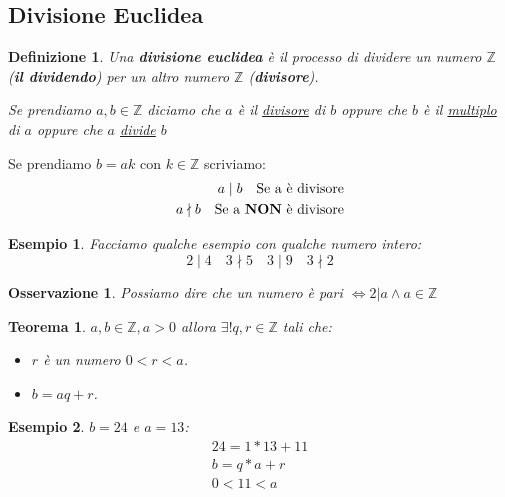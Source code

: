 \documentclass{article}
\newtheorem{exmp}{Esempio}[section]
\newtheorem{theorem}{Teorema}[section]
\newtheorem{definition}{Definizione}[section]
\newtheorem{oss}{Osservazione}[section]
\begin{document}
\subsection{Divisione Euclidea}\label{sec:divisione_euclidea}
\begin{definition}
       Una \textbf{divisione euclidea} è il processo di dividere un numero $ \mathbb{Z} $ (\textbf{il dividendo}) per un altro numero $ \mathbb{Z} $ (\textbf{divisore}). \par
       Se prendiamo $ a,b \in \mathbb{Z} $ diciamo che $ a $ è il \underline{divisore} di $ b $ oppure che $ b $ è il \underline{multiplo} di $ a $ oppure che $ a $ \underline{divide} $ b $        
\end{definition}

Se prendiamo $ b = ak $ con $ k \in \mathbb{Z} $ scriviamo:
\begin{align*}
        a \mid b \quad \mbox{Se a è divisore} \\
        a \nmid b \quad \mbox{Se a \textbf{NON} è divisore}
\end{align*}

\begin{exmp}
        Facciamo qualche esempio con qualche numero intero:
        \begin{equation*}
                2 \mid 4 \quad 3 \nmid 5 \quad 3 \mid 9 \quad 3 \nmid 2
        \end{equation*} 
\end{exmp}

\begin{oss}
       Possiamo dire che un numero è pari $ \Leftrightarrow 2 | a \wedge a \in \mathbb{Z} $  
\end{oss}

\begin{theorem}
       $ a,b \in \mathbb{Z}, a > 0 $ allora $ \exists! q,r \in \mathbb{Z}  $ tali che:
       \begin{itemize}
               \item $ r $ è un numero $ 0 < r < a $.
               \item $ b = aq + r $.  
       \end{itemize}
\end{theorem}

\begin{exmp}
        $ b = 24 $ e $ a = 13 $:
        \begin{align*}
                24 = 1 * 13 + 11 \\
                b = q * a + r \\
                0 < 11 < a
        \end{align*}
\end{exmp}
\end{document}
